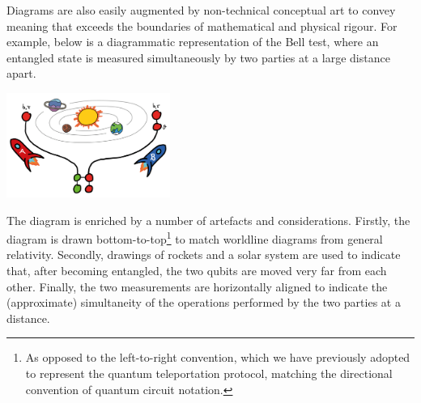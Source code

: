 Diagrams are also easily augmented by non-technical conceptual art to convey meaning that exceeds the boundaries of mathematical and physical rigour.
For example, below is a diagrammatic representation of the Bell test, where an entangled state is measured simultaneously by two parties at a large distance apart.
\begin{center}
    \includegraphics[width=0.4\textwidth]{Sections/pictures/diagrams-mixed-media.png}
\end{center}
The diagram is enriched by a number of artefacts and considerations.
Firstly, the diagram is drawn bottom-to-top\footnote{As opposed to the left-to-right convention, which we have previously adopted to represent the quantum teleportation protocol, matching the directional convention of quantum circuit notation.} to match worldline diagrams from general relativity.
Secondly, drawings of rockets and a solar system are used to indicate that, after becoming entangled, the two qubits are moved very far from each other.
Finally, the two measurements are horizontally aligned to indicate the (approximate) simultaneity of the operations performed by the two parties at a distance.

